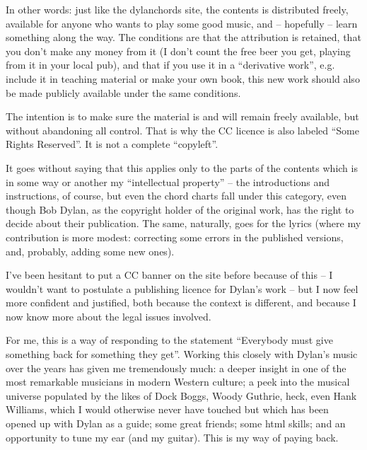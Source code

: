In other words: just like the dylanchords site, the contents is
distributed freely, available for anyone who wants to play some good
music, and -- hopefully -- learn something along the way. The
conditions are that the attribution is retained, that you don't make
any money from it (I don't count the free beer you get, playing from
it in your local pub), and that if you use it in a ``derivative
work'', e.g. include it in teaching material or make your own book,
this new work should also be made publicly available under the same
conditions.
 
The intention is to make sure the material is and will remain freely
available, but without abandoning all control. That is why the CC
licence is also labeled ``Some Rights Reserved''{}. It is not a
complete ``copyleft''{}.
 
It goes without saying that this applies only to the parts of the
contents which is in some way or another my ``intellectual property''
-- the introductions and instructions, of course, but even the chord
charts fall under this category, even though Bob Dylan, as the
copyright holder of the original work, has the right to decide about
their publication. The same, naturally, goes for the lyrics (where my
contribution is more modest: correcting some errors in the published
versions, and, probably, adding some new ones).
 
I've been hesitant to put a CC banner on the site before because of
this -- I wouldn't want to postulate a publishing licence for
Dylan's work -- but I now feel more confident and justified, both
because the context is different, and because I now know more about
the legal issues involved.
 
For me, this is a way of responding to the statement ``Everybody must
give something back for something they get''. Working this closely
with Dylan's music over the years has given me tremendously much: a
deeper insight in one of the most remarkable musicians in modern
Western culture; a peek into the musical universe populated by the
likes of Dock Boggs, Woody Guthrie, heck, even Hank Williams, which I
would otherwise never have touched but which has been opened up with
Dylan as a guide; some great friends; some html skills; and an
opportunity to tune my ear (and my guitar). This is my way of paying
back.

